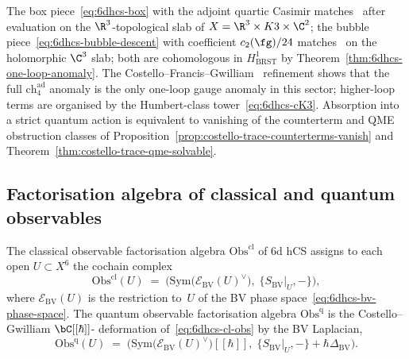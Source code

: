 \begin{remark}
\label{rem:6dhcs-CFG-CL-costello17}
The box piece~\eqref{eq:6dhcs-box} with the adjoint quartic
Casimir matches~\cite[eq.\,(5.17)]{Costello2017M5} after evaluation
on the $\R^3$-topological slab of $X=\R^3\times K3\times\C^2$; the
bubble piece~\eqref{eq:6dhcs-bubble-descent} with coefficient
$c_2(\fg)/24$ matches~\cite[eq.\,(6.12)]{CL16} on the
holomorphic $\C^3$ slab; both are cohomologous in
$H^1_{\mathrm{BRST}}$ by
Theorem~\ref{thm:6dhcs-one-loop-anomaly}. The
Costello--Francis--Gwilliam~\cite{CFG2026} refinement shows that
the full $\mathrm{ch}_4^{\mathrm{ad}}$ anomaly is the only
one-loop gauge anomaly in this sector; higher-loop terms are organised
by the Humbert-class tower~\eqref{eq:6dhcs-cK3}. Absorption into a
strict quantum action is equivalent to vanishing of the counterterm and
QME obstruction classes of
Proposition~\ref{prop:costello-trace-counterterms-vanish} and
Theorem~\ref{thm:costello-trace-qme-solvable}.
\end{remark}

\subsection{Factorisation algebra of classical and quantum observables}
\label{subsec:6dhcs-facalg}

\begin{definition}
\label{def:6dhcs-obs}
The classical observable factorisation algebra
$\mathrm{Obs}^{\mathrm{cl}}$ of 6d hCS assigns to each open
$U \subset X^6$ the cochain complex
\begin{equation}\label{eq:6dhcs-cl-obs}
 \mathrm{Obs}^{\mathrm{cl}}(U)
 \;=\;
 \bigl(
 \mathrm{Sym}\bigl(\mathcal{E}_{\mathrm{BV}}(U)^\vee\bigr),\;
 \{S_{\mathrm{BV}}|_U, -\}
 \bigr),
\end{equation}
where $\mathcal{E}_{\mathrm{BV}}(U)$ is the restriction to~$U$ of the
BV phase space~\eqref{eq:6dhcs-bv-phase-space}. The quantum
observable factorisation algebra
$\mathrm{Obs}^{\mathrm{q}}$ is the Costello--Gwilliam $\bC[[\hbar]]$-
deformation of~\eqref{eq:6dhcs-cl-obs} by the BV Laplacian,
\begin{equation}\label{eq:6dhcs-q-obs}
 \mathrm{Obs}^{\mathrm{q}}(U)
 \;=\;
 \bigl(
 \mathrm{Sym}\bigl(\mathcal{E}_{\mathrm{BV}}(U)^\vee\bigr)[[\hbar]],\;
 \{S_{\mathrm{BV}}|_U, -\} + \hbar \Delta_{\mathrm{BV}}
 \bigr).
\end{equation}
\end{definition}

